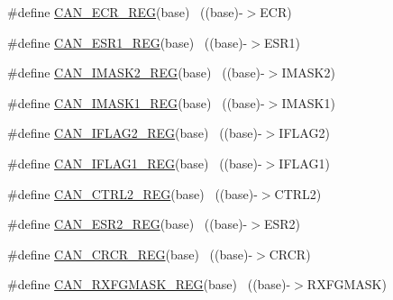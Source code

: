 \begin{DoxyCompactItemize}
\#define \hyperlink{group___c_a_n___register___accessor___macros_gaea1f06ad20b64003714c92898b52e990}{C\+A\+N\+\_\+\+E\+C\+R\+\_\+\+R\+EG}(base)                                            ~((base)-\/$>$E\+CR)
\item 
\#define \hyperlink{group___c_a_n___register___accessor___macros_ga1aa0d53df307e5204e551bcd363f01e8}{C\+A\+N\+\_\+\+E\+S\+R1\+\_\+\+R\+EG}(base)                                          ~((base)-\/$>$E\+S\+R1)
\item 
\#define \hyperlink{group___c_a_n___register___accessor___macros_gade3a98dd75556ce2b6f1eb832e6e0824}{C\+A\+N\+\_\+\+I\+M\+A\+S\+K2\+\_\+\+R\+EG}(base)                                      ~((base)-\/$>$I\+M\+A\+S\+K2)
\item 
\#define \hyperlink{group___c_a_n___register___accessor___macros_ga80231dca89e90952e2e8e7b3b11da333}{C\+A\+N\+\_\+\+I\+M\+A\+S\+K1\+\_\+\+R\+EG}(base)                                      ~((base)-\/$>$I\+M\+A\+S\+K1)
\item 
\#define \hyperlink{group___c_a_n___register___accessor___macros_ga3266d1a00bf3a4fc3c464e9992bbd20c}{C\+A\+N\+\_\+\+I\+F\+L\+A\+G2\+\_\+\+R\+EG}(base)                                      ~((base)-\/$>$I\+F\+L\+A\+G2)
\item 
\#define \hyperlink{group___c_a_n___register___accessor___macros_ga516d5bdd31eb73adc70fcd9e8db6d6a7}{C\+A\+N\+\_\+\+I\+F\+L\+A\+G1\+\_\+\+R\+EG}(base)                                      ~((base)-\/$>$I\+F\+L\+A\+G1)
\item 
\#define \hyperlink{group___c_a_n___register___accessor___macros_ga3c0ddaade29c100875426d48d55b2d86}{C\+A\+N\+\_\+\+C\+T\+R\+L2\+\_\+\+R\+EG}(base)                                        ~((base)-\/$>$C\+T\+R\+L2)
\item 
\#define \hyperlink{group___c_a_n___register___accessor___macros_gac7a8b908fcbf6e6ab0e1334e4fc016c2}{C\+A\+N\+\_\+\+E\+S\+R2\+\_\+\+R\+EG}(base)                                          ~((base)-\/$>$E\+S\+R2)
\item 
\#define \hyperlink{group___c_a_n___register___accessor___macros_ga0521321bfb9492998974d3ad267a8141}{C\+A\+N\+\_\+\+C\+R\+C\+R\+\_\+\+R\+EG}(base)                                          ~((base)-\/$>$C\+R\+CR)
\item 
\#define \hyperlink{group___c_a_n___register___accessor___macros_gaba4437c8c233beb2457cd30d2be5defa}{C\+A\+N\+\_\+\+R\+X\+F\+G\+M\+A\+S\+K\+\_\+\+R\+EG}(base)                                  ~((base)-\/$>$R\+X\+F\+G\+M\+A\+SK)
\item 

\end{DoxyCompactItemize}
